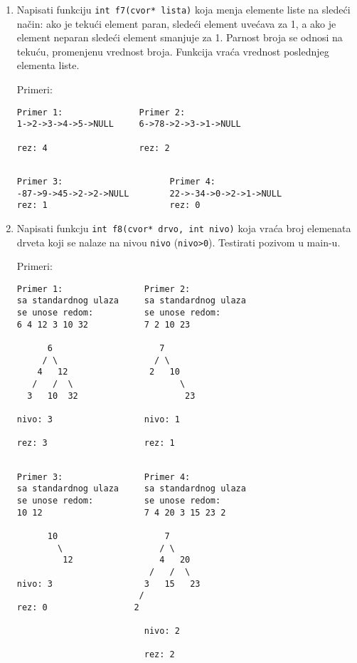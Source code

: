 \begin{enumerate}
\item
Napisati funkciju \verb|int f7(cvor* lista)| koja menja elemente liste na slede\' ci na\v cin:
ako je teku\' ci element paran,
slede\' ci element uve\' cava za 1, a ako je element neparan slede\' ci element smanjuje za 1.
Parnost broja se odnosi na teku\' cu, promenjenu vrednost broja. Funkcija vra\'ca
vrednost poslednjeg elementa liste.

Primeri:
\begin{verbatim}
Primer 1:               Primer 2:
1->2->3->4->5->NULL     6->78->2->3->1->NULL

rez: 4                  rez: 2


\end{verbatim}

\begin{verbatim}
Primer 3:                     Primer 4:
-87->9->45->2->2->NULL        22->-34->0->2->1->NULL
rez: 1                        rez: 0
\end{verbatim}


\item
Napisati funkcju \verb|int f8(cvor* drvo, int nivo)|
koja vra\'ca  broj elemenata drveta koji se nalaze na nivou \verb|nivo| (\verb|nivo>0|).
Testirati pozivom u main-u.

Primeri:
\begin{verbatim}
Primer 1:                Primer 2:
sa standardnog ulaza     sa standardnog ulaza
se unose redom:          se unose redom:
6 4 12 3 10 32           7 2 10 23

      6                     7
     / \                   / \
    4   12                2   10
   /   /  \                     \
  3   10  32                     23

nivo: 3                  nivo: 1

rez: 3                   rez: 1


\end{verbatim}

\begin{verbatim}
Primer 3:                Primer 4:
sa standardnog ulaza     sa standardnog ulaza
se unose redom:          se unose redom:
10 12                    7 4 20 3 15 23 2

      10                     7
        \                   / \
         12                 4   20
                          /   /  \
nivo: 3                  3   15   23
                        /
rez: 0                 2

                         nivo: 2

                         rez: 2
\end{verbatim}
\end{enumerate}


